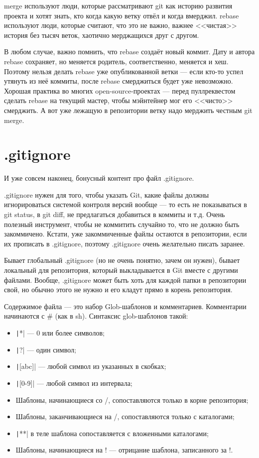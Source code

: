 \documentclass{../../text-style}
\begin{document}
merge используют люди, которые рассматривают git как историю развития проекта и хотят знать, кто когда какую ветку отвёл и когда вмерджил. rebase используют люди, которые считают, что это не важно, важнее <<чистая>> история без тысяч веток, хаотично мерджащихся друг с другом.

В любом случае, важно помнить, что rebase создаёт новый коммит. Дату и автора rebase сохраняет, но меняется родитель, соответственно, меняется и хеш. Поэтому нельзя делать rebase уже опубликованной ветки --- если кто-то успел утянуть из неё коммиты, после rebase смерджиться будет уже невозможно. Хорошая практика во многих open-source-проектах --- перед пуллреквестом сделать rebase на текущий мастер, чтобы мэйнтейнер мог его <<чисто>> смерджить. А вот уже лежащую в репозитории ветку надо мерджить честным git merge.

\section{.gitignore}

И уже совсем наконец, бонусный контент про файл .gitignore.

.gitignore нужен для того, чтобы указать Git, какие файлы должны игнорироваться системой контроля версий вообще --- то есть не показываться в git status, в git diff, не предлагаться добавиться в коммиты и т.д. Очень полезный инструмент, чтобы не коммитить случайно то, что не должно быть закоммичено. Кстати, уже закоммиченные файлы остаются в репозитории, если их прописать в .gitignore, поэтому .gitignore очень желательно писать заранее. 

Бывает глобальный .gitignore (но не очень понятно, зачем он нужен), бывает локальный для репозитория, который выкладывается в Git вместе с другими файлами. Вообще, .gitignore может быть хоть для каждой папки в репозитории свой, но обычно этого не нужно и его кладут прямо в корень репозитория.

Содержимое файла --- это набор Glob-шаблонов и комментариев. Комментарии начинаются с \# (как в sh). Синтаксис glob-шаблонов такой:

\begin{itemize}
    \item \texttt|*| --- 0 или более символов;
    \item \texttt|?| --- один символ;
    \item \texttt|[abc]| --- любой символ из указанных в скобках;
    \item \texttt|[0-9]| --- любой символ из интервала;
    \item Шаблоны, начинающиеся со /, сопоставляются только в корне репозитория;
    \item Шаблоны, заканчивающиеся на /, сопоставляются только с каталогами;
    \item \texttt|**| в теле шаблона сопоставляется с вложенными каталогами;
    \item Шаблоны, начинающиеся на ! --- отрицание шаблона, записанного за !.
\end{itemize}
\end{document}
